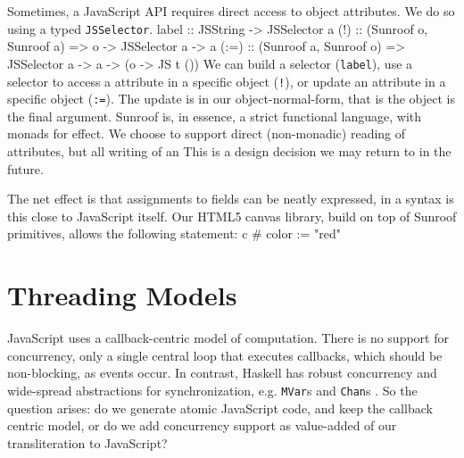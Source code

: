 \documentclass{llncs}
\newcommand{\Src}[1]{{\tt{#1}}}
\newenvironment{Code}{\verbatim}{\endverbatim}
\begin{document}
Sometimes, a JavaScript API requires direct access to object attributes.
We do so using a typed \Src{JSSelector}.
\begin{Code}
label :: JSString -> JSSelector a
(!)   :: (Sunroof o, Sunroof a) => o -> JSSelector a -> a
(:=)  :: (Sunroof a, Sunroof o) => JSSelector a -> a -> (o -> JS t ())
\end{Code}
We can build a selector (\Src{label}), use a selector to access a attribute in a specific
object (\Src{!}), or update an attribute in a specific object (\Src{:=}).
The update is in our object-normal-form, that is the object is the final argument.
Sunroof is, in essence, a strict functional language, with monads for effect.
We choose to support direct (non-monadic) reading of attributes, but
all writing of an 
This is a design decision we may return to in the future.

The net effect is that assignments to fields can be neatly expressed,
in a syntax is this close to JavaScript itself. Our HTML5 canvas library,
build on top of Sunroof primitives, allows the following statement:
\begin{Code}
  c # color := "red"
\end{Code}




\section{Threading Models}
\label{sec:threading-models}

JavaScript uses a callback-centric model of computation. There
is no support for concurrency, only a single central loop that executes
callbacks, which should be non-blocking, as events occur.
In contrast, Haskell has robust concurrency and wide-spread 
abstractions for synchronization, e.g. \Src{MVar}s and \Src{Chan}s
\cite{Jones:96:ConcurrentHaskell}.
So the question arises: do we generate atomic JavaScript code, 
and keep the callback centric model, or do we add concurrency
support as value-added of our transliteration to JavaScript?
\end{document}
